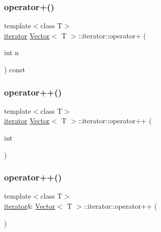 \mbox{\label{classVector_1_1iterator_ae04a470594c8475c04e229cd8711b585_ae04a470594c8475c04e229cd8711b585}} 
\subsubsection{\texorpdfstring{operator+()}{operator+()}}
{\footnotesize\ttfamily template$<$class T$>$ \\
\hyperlink{classVector_1_1iterator}{iterator} \hyperlink{classVector}{Vector}$<$ T $>$\+::iterator\+::operator+ (\begin{DoxyParamCaption}\item[{int}]{n }\end{DoxyParamCaption}) const\hspace{0.3cm}{\ttfamily [inline]}}

\mbox{\label{classVector_1_1iterator_ac67c9225a0971d334d02246291922539_ac67c9225a0971d334d02246291922539}} 
\subsubsection{\texorpdfstring{operator++()}{operator++()}\hspace{0.1cm}{\footnotesize\ttfamily [1/2]}}
{\footnotesize\ttfamily template$<$class T$>$ \\
\hyperlink{classVector_1_1iterator}{iterator} \hyperlink{classVector}{Vector}$<$ T $>$\+::iterator\+::operator++ (\begin{DoxyParamCaption}\item[{int}]{ }\end{DoxyParamCaption})\hspace{0.3cm}{\ttfamily [inline]}}

\mbox{\label{classVector_1_1iterator_a5016f39ffd22095b6fa9de87a5dac20e_a5016f39ffd22095b6fa9de87a5dac20e}} 
\subsubsection{\texorpdfstring{operator++()}{operator++()}\hspace{0.1cm}{\footnotesize\ttfamily [2/2]}}
{\footnotesize\ttfamily template$<$class T$>$ \\
\hyperlink{classVector_1_1iterator}{iterator}\& \hyperlink{classVector}{Vector}$<$ T $>$\+::iterator\+::operator++ (\begin{DoxyParamCaption}{ }\end{DoxyParamCaption})\hspace{0.3cm}{\ttfamily [inline]}}

